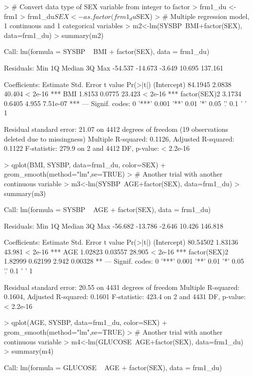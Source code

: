 \documentclass{article}
\begin{document}
\begin{Schunk}
\begin{Sinput}
> # Convert data type of SEX variable from integer to factor 
> frm1_du <- frm1
> frm1_du$SEX <- as.factor(frm1_du$SEX)
> # Multiple regression model, 1 continuous and 1 categorical variables
> m2<-lm(SYSBP~BMI+factor(SEX), data=frm1_du)
> summary(m2)
\end{Sinput}
\begin{Soutput}
Call:
lm(formula = SYSBP ~ BMI + factor(SEX), data = frm1_du)

Residuals:
    Min      1Q  Median      3Q     Max 
-54.537 -14.673  -3.649  10.695 137.161 

Coefficients:
             Estimate Std. Error t value Pr(>|t|)    
(Intercept)   84.1945     2.0838  40.404  < 2e-16 ***
BMI            1.8153     0.0775  23.423  < 2e-16 ***
factor(SEX)2   3.1734     0.6405   4.955 7.51e-07 ***
---
Signif. codes:  0 '***' 0.001 '**' 0.01 '*' 0.05 '.' 0.1 ' ' 1

Residual standard error: 21.07 on 4412 degrees of freedom
  (19 observations deleted due to missingness)
Multiple R-squared:  0.1126,	Adjusted R-squared:  0.1122 
F-statistic: 279.9 on 2 and 4412 DF,  p-value: < 2.2e-16
\end{Soutput}
\begin{Sinput}
> qplot(BMI, SYSBP, data=frm1_du, color=SEX) + geom_smooth(method="lm",se=TRUE)
> # Another trial with another continuous variable
> m3<-lm(SYSBP~AGE+factor(SEX), data=frm1_du)
> summary(m3)
\end{Sinput}
\begin{Soutput}
Call:
lm(formula = SYSBP ~ AGE + factor(SEX), data = frm1_du)

Residuals:
    Min      1Q  Median      3Q     Max 
-56.682 -13.786  -2.646  10.426 146.818 

Coefficients:
             Estimate Std. Error t value Pr(>|t|)    
(Intercept)  80.54502    1.83136  43.981  < 2e-16 ***
AGE           1.02823    0.03557  28.905  < 2e-16 ***
factor(SEX)2  1.82999    0.62199   2.942  0.00328 ** 
---
Signif. codes:  0 '***' 0.001 '**' 0.01 '*' 0.05 '.' 0.1 ' ' 1

Residual standard error: 20.55 on 4431 degrees of freedom
Multiple R-squared:  0.1604,	Adjusted R-squared:  0.1601 
F-statistic: 423.4 on 2 and 4431 DF,  p-value: < 2.2e-16
\end{Soutput}
\begin{Sinput}
> qplot(AGE, SYSBP, data=frm1_du, color=SEX) + geom_smooth(method="lm",se=TRUE)
> # Another trial with another continuous variable
> m4<-lm(GLUCOSE~AGE+factor(SEX), data=frm1_du)
> summary(m4)
\end{Sinput}
\begin{Soutput}
Call:
lm(formula = GLUCOSE ~ AGE + factor(SEX), data = frm1_du)


\end{Soutput}
\end{Schunk}
\end{document}
